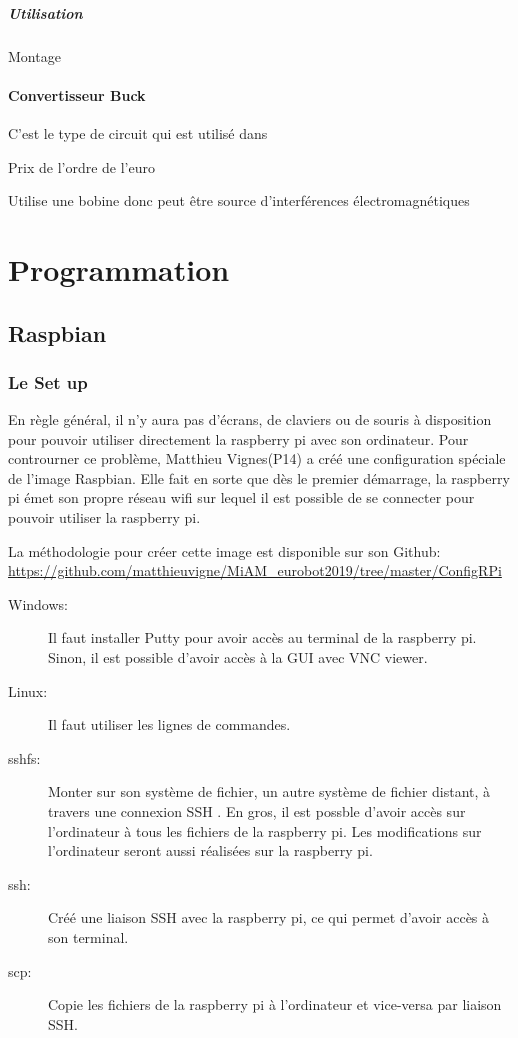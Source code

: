 \documentclass[a4paper, 11pt]{report}
\begin{document}
\subsubsection{Utilisation}

Montage

\subsection{Convertisseur Buck}
C'est le type de circuit qui est utilisé dans 

Prix de l'ordre de l'euro

Utilise une bobine donc peut être source d'interférences électromagnétiques

\part{Programmation}

\chapter{Raspbian}

\section{Le Set up}
En règle général, il n'y aura pas d'écrans, de claviers ou de souris à disposition pour pouvoir utiliser directement la raspberry pi avec son ordinateur. Pour controurner ce problème, Matthieu Vignes(P14) a créé une configuration spéciale de l'image Raspbian.  Elle fait en sorte que dès le premier démarrage, la raspberry pi émet son propre réseau wifi sur lequel il est possible de se connecter pour pouvoir utiliser la raspberry pi.

La méthodologie pour créer cette image est disponible sur son Github:
\url{https://github.com/matthieuvigne/MiAM_eurobot2019/tree/master/ConfigRPi}

\begin{description}
\item[Windows:]Il faut installer Putty pour avoir accès au terminal de la raspberry pi. Sinon, il est possible d'avoir accès à la GUI avec VNC viewer.
\item[Linux:]Il faut utiliser les lignes de commandes.
\end{description}

\begin{description}
\item[sshfs:]Monter sur son système de fichier, un autre système de fichier distant, à travers une connexion SSH . En gros, il est possble d'avoir accès sur l'ordinateur à tous les fichiers de la raspberry pi. Les modifications sur l'ordinateur seront aussi réalisées sur la raspberry pi.
\item[ssh:]Créé une liaison SSH avec la raspberry pi, ce qui permet d'avoir accès à son terminal.
\item[scp:]Copie les fichiers de la raspberry pi à l'ordinateur et vice-versa par liaison SSH. 
\end{description}
\end{document}
